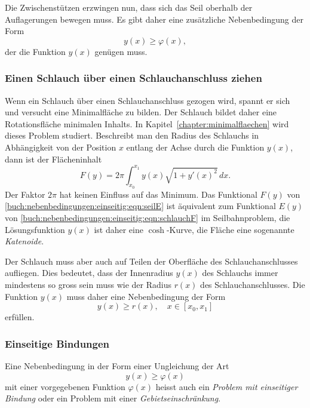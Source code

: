 Die Zwischenstützen erzwingen nun, dass sich das Seil oberhalb der 
Auflagerungen bewegen muss.
Es gibt daher eine zusätzliche Nebenbedingung der Form
\[
y(x) \ge \varphi(x),
\]
der die Funktion $y(x)$ genügen muss.

%
%
\subsubsection{Einen Schlauch über einen Schlauchanschluss ziehen}
Wenn ein Schlauch über einen Schlauchanschluss gezogen wird, spannt
%
%
er sich und versucht eine Minimalfläche zu bilden.
%
Der Schlauch bildet daher eine Rotationsfläche minimalen Inhalts.
%
In Kapitel~\ref{chapter:minimalflaechen} wird dieses Problem 
studiert.
Beschreibt man den Radius des Schlauchs in Abhängigkeit von der
Position $x$ entlang der Achse durch die Funktion $y(x)$, dann ist
der Flächeninhalt
\begin{equation}
F(y)
=
2\pi
\int_{x_0}^{x_1}
y(x)\sqrt{1+y'(x)^2}\,dx.
\label{buch:nebenbedingungen:einseitig:eqn:schlauchF}
\end{equation}
Der Faktor $2\pi$ hat keinen Einfluss auf das Minimum.
Das Funktional $F(y)$ von
\eqref{buch:nebenbedingungen:einseitig:eqn:seilE}
ist äquivalent zum Funktional $E(y)$ von
\eqref{buch:nebenbedingungen:einseitig:eqn:schlauchF}
im Seilbahnproblem,
die Lösungsfunktion $y(x)$ ist daher eine $\cosh$-Kurve,
die Fläche eine sogenannte {\em Katenoide}.

Der Schlauch muss aber auch auf Teilen der Oberfläche des
Schlauchanschlusses aufliegen.
Dies bedeutet, dass der Innenradius $y(x)$ des Schlauchs immer
mindestens so gross sein muss wie der Radius $r(x)$ des Schlauchanschlusses.
Die Funktion $y(x)$ muss daher eine Nebenbedingung der Form
\[
y(x) \ge r(x),\quad x\in[x_0,x_1]
\]
erfüllen.

%
%
\subsubsection{Einseitige Bindungen}
Eine Nebenbedingung in der Form einer Ungleichung der Art
\[
y(x) \ge \varphi(x)
\]
mit einer vorgegebenen Funktion $\varphi(x)$ heisst auch
ein {\em Problem mit einseitiger Bindung}
%
%
oder ein Problem mit einer {\em Gebietseinschränkung}.
%

